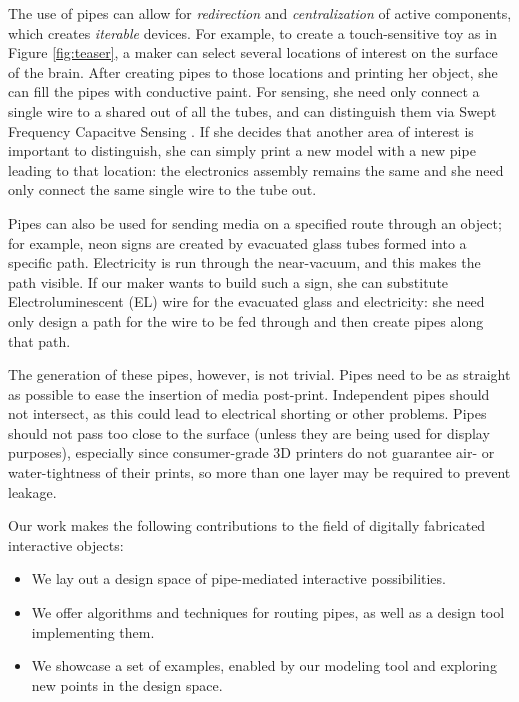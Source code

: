 The use of pipes can allow for \emph{redirection} and \emph{centralization} of active components, which creates \emph{iterable} devices.  For example, to create a touch-sensitive toy as in Figure \ref{fig:teaser}, a maker can select several locations of interest on the surface of the brain.  After creating pipes to those locations and printing her object, she can fill the pipes with conductive paint.  For sensing, she need only connect a single wire to a shared out of all the tubes, and can distinguish them via Swept Frequency Capacitve Sensing \cite{Sato-touche}.  If she decides that another area of interest is important to distinguish, she can simply print a new model with a new pipe leading to that location: the electronics assembly remains the same and she need only connect the same single wire to the tube out.  

Pipes can also be used for sending media on a specified route through an object; for example, neon signs are created by evacuated glass tubes formed into a specific path.  Electricity is run through the near-vacuum, and this makes the path visible.  If our maker wants to build such a sign, she can substitute Electroluminescent (EL) wire for the evacuated glass and electricity: she need only design a path for the wire to be fed through and then create pipes along that path.

The generation of these pipes, however, is not trivial.  Pipes need to be as straight as possible to ease the insertion of media post-print.  Independent pipes should not intersect, as this could lead to electrical shorting or other problems.  Pipes should not pass too close to the surface (unless they are being used for display purposes), especially since consumer-grade 3D printers do not guarantee air- or water-tightness of their prints, so more than one layer may be required to prevent leakage.

Our work makes the following contributions to the field of digitally fabricated interactive objects:

\begin{itemize}
\item We lay out a design space of pipe-mediated interactive possibilities. 
\item We offer algorithms and techniques for routing pipes, as well as a design tool implementing them.
\item We showcase a set of examples, enabled by our modeling tool and exploring new points in the design space.
\end{itemize}

